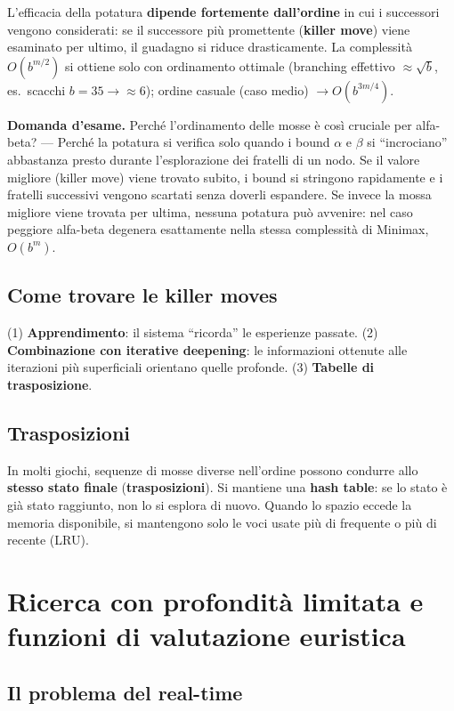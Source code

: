 \documentclass[11pt,a4paper]{report}
\newcommand{\domandaesame}[1]{\begin{esame}\textbf{Domanda d'esame.} #1\end{esame}}
\begin{document}
L'efficacia della potatura \textbf{dipende fortemente dall'ordine} in cui i successori vengono considerati: se il successore più promettente (\textbf{killer move}) viene esaminato per ultimo, il guadagno si riduce drasticamente. La complessità $O(b^{m/2})$ si ottiene solo con ordinamento ottimale (branching effettivo $\approx \sqrt{b}$, es.\ scacchi $b=35 \to \approx 6$); ordine casuale (caso medio) $\to O(b^{3m/4})$.

\domandaesame{Perché l'ordinamento delle mosse è così cruciale per alfa-beta? --- Perché la potatura si verifica solo quando i bound $\alpha$ e $\beta$ si ``incrociano'' abbastanza presto durante l'esplorazione dei fratelli di un nodo. Se il valore migliore (killer move) viene trovato subito, i bound si stringono rapidamente e i fratelli successivi vengono scartati senza doverli espandere. Se invece la mossa migliore viene trovata per ultima, nessuna potatura può avvenire: nel caso peggiore alfa-beta degenera esattamente nella stessa complessità di Minimax, $O(b^m)$.}

\subsection*{Come trovare le killer moves}

(1) \textbf{Apprendimento}: il sistema ``ricorda'' le esperienze passate. (2) \textbf{Combinazione con iterative deepening}: le informazioni ottenute alle iterazioni più superficiali orientano quelle profonde. (3) \textbf{Tabelle di trasposizione}.

\subsection*{Trasposizioni}

In molti giochi, sequenze di mosse diverse nell'ordine possono condurre allo \textbf{stesso stato finale} (\textbf{trasposizioni}). Si mantiene una \textbf{hash table}: se lo stato è già stato raggiunto, non lo si esplora di nuovo. Quando lo spazio eccede la memoria disponibile, si mantengono solo le voci usate più di frequente o più di recente (LRU).

\section{Ricerca con profondità limitata e funzioni di valutazione euristica}

\subsection*{Il problema del real-time}
\end{document}
